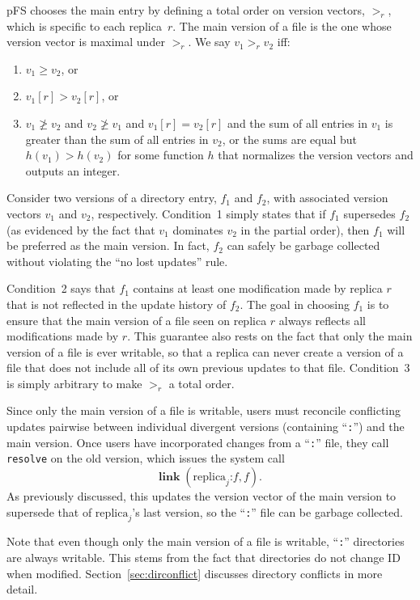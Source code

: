 pFS chooses the main entry by defining a total order on version
vectors, $>_r$, which is specific to each replica~$r$.  The main
version of a file is the one whose version vector is maximal under
$>_r$.  We say $v_1>_rv_2$ iff:
\begin{enumerate}
\item $v_1\ge v_2$, or
\item $v_1[r]>v_2[r]$, or
\item $v_1\not\ge v_2$ and $v_2\not\ge v_1$ and $v_1[r]=v_2[r]$ and
  the sum of all entries in $v_1$ is greater than the sum of all
  entries in $v_2$, or the sums are equal but $h(v_1)>h(v_2)$ for some
  function $h$ that normalizes the version vectors and outputs an
  integer.
\end{enumerate}

Consider two versions of a directory entry, $f_1$ and $f_2$, with
associated version vectors $v_1$ and $v_2$, respectively.  Condition~1
simply states that if $f_1$ supersedes $f_2$ (as evidenced by the fact
that $v_1$ dominates $v_2$ in the partial order), then $f_1$ will be
preferred as the main version.  In fact, $f_2$ can safely be garbage
collected without violating the ``no lost updates'' rule.

Condition~2 says that $f_1$ contains at least one modification made by
replica $r$ that is not reflected in the update history of $f_2$.  The
goal in choosing $f_1$ is to ensure that the main version of a file
seen on replica $r$ always reflects all modifications made by $r$.
This guarantee also rests on the fact that only the main version of a
file is ever writable, so that a replica can never create a version of
a file that does not include all of its own previous updates to that
file.  Condition~3 is simply arbitrary to make $>_r$ a total order.

Since only the main version of a file is writable, users must
reconcile conflicting updates pairwise between individual divergent
versions (containing ``\texttt{:}'') and the main version.  Once users
have incorporated changes from a ``\texttt{:}'' file, they call
\texttt{resolve} on the old version, which issues the system call
$$\mathbf{link}\; (\mathrm{replica}_j\texttt{:}f, f).$$
As previously discussed, this updates the version vector of the main
version to supersede that of $\mathrm{replica}_j$'s last version, so
the ``\texttt{:}'' file can be garbage collected.

Note that even though only the main version of a file is writable,
``\texttt{:}'' directories are always writable.  This stems from the
fact that directories do not change ID when modified.
Section~\ref{sec:dirconflict} discusses directory conflicts in more
detail.

